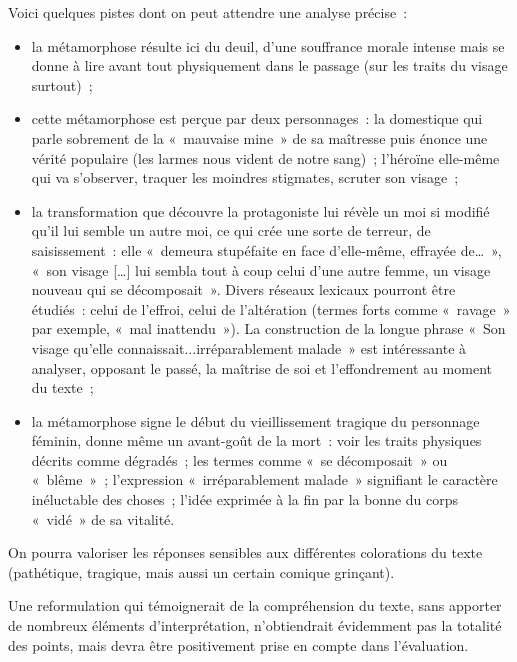 {Voici quelques pistes dont on peut attendre une analyse précise~:

\begin{itemize}
\item la métamorphose résulte ici du deuil, d'une souffrance morale intense mais se
donne à lire avant tout physiquement dans le passage (sur les traits du visage
surtout)~;
\item cette métamorphose est perçue par deux personnages~: la domestique qui parle
sobrement de la «~mauvaise mine~» de sa maîtresse puis énonce une vérité
populaire (les larmes nous vident de notre sang)~; l'héroïne elle-même qui va
s'observer, traquer les moindres stigmates, scruter son visage~;
\item la transformation que découvre la protagoniste lui révèle un moi si modifié qu'il lui
semble un autre moi, ce qui crée une sorte de terreur, de saisissement~: elle
«~demeura stupéfaite en face d'elle-même, effrayée de…~», «~son visage […] lui
sembla tout à coup celui d'une autre femme, un visage nouveau qui se
décomposait~». Divers réseaux lexicaux pourront être étudiés~: celui de l'effroi, celui
de l'altération (termes forts comme «~ravage~» par exemple, «~mal inattendu~»). La
construction de la longue phrase «~Son visage qu'elle connaissait...irréparablement
malade~» est intéressante à analyser, opposant le passé, la maîtrise de soi et
l'effondrement au moment du texte~;
\item la métamorphose signe le début du vieillissement tragique du personnage féminin,
donne même un avant-goût de la mort~: voir les traits physiques décrits comme
dégradés~; les termes comme «~se décomposait~» ou «~blême~»~; l'expression
«~irréparablement malade~» signifiant le caractère inéluctable des choses~; l'idée
exprimée à la fin par la bonne du corps «~vidé~» de sa vitalité.
\end{itemize}

\bigskip

On pourra valoriser les réponses sensibles aux différentes colorations du texte
(pathétique, tragique, mais aussi un certain comique grinçant).

Une reformulation qui témoignerait de la compréhension du texte, sans apporter de
nombreux éléments d'interprétation, n'obtiendrait évidemment pas la totalité des
points, mais devra être positivement prise en compte dans l'évaluation.}%
